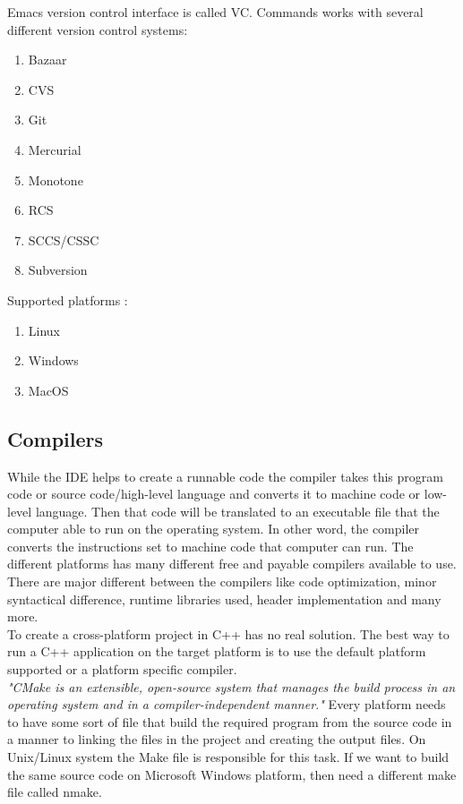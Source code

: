 \documentclass[12pt]{article}
\begin{document}
{{\begin{enumerate}
Emacs version control interface is called VC. Commands works with several different version control systems:
\begin{enumerate}
\item Bazaar
\item CVS
\item Git
\item Mercurial
\item Monotone
\item RCS
\item SCCS/CSSC
\item Subversion
\end{enumerate} 

Supported platforms : 
\begin{enumerate}
\item Linux
\item Windows
\item MacOS
\end{enumerate}

\end{enumerate}
}

\subsection{Compilers}
While the IDE helps to create a runnable code the compiler takes this program code or source code/high-level language and converts it to machine code or low-level language. Then that code will be translated to an executable file that the computer able to run on the operating system. In other word, the compiler converts the instructions set to machine code that computer can run. The different platforms has many different free and payable compilers available to use. There are  major different between the compilers like code optimization, minor syntactical difference, runtime libraries used, header implementation and many more.\cite{Bolton}\\

To create a cross-platform project in C++ has no real solution. The best way to run a C++ application on the target platform is to use the default platform supported or a platform specific compiler.\\

\textit{"CMake is an extensible, open-source system that manages the build process in an operating system and in a compiler-independent manner."\cite{CMake}} Every platform needs to have some sort of file that build the required program from the source code in a manner to linking the files in the project and creating the output files. On Unix/Linux system the Make file is responsible for this task. If we want to build the same source code on Microsoft Windows platform, then need a different make file called nmake.\\

}
\end{document}
